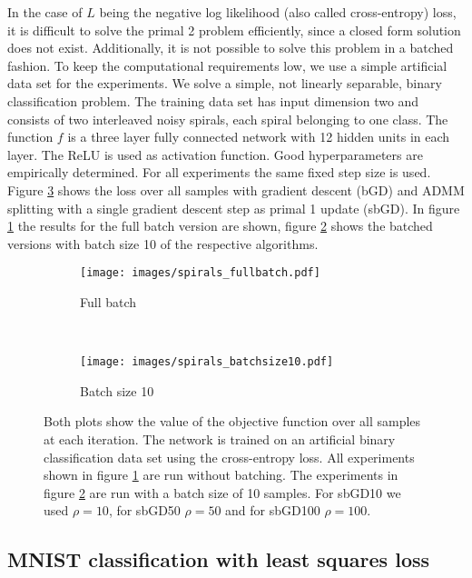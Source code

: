 \documentclass[english,11pt,a4paper]{article}
\begin{document}
In the case of $L$ being the negative log likelihood (also called cross-entropy) loss, it is difficult to solve the primal 2 problem efficiently, since a closed form solution does not exist. Additionally, it is not possible to solve this problem in a batched fashion. To keep the computational requirements low, we use a simple artificial data set for the experiments. We solve a simple, not linearly separable, binary classification problem. The training data set has input dimension two and consists of two interleaved noisy spirals, each spiral belonging to one class. The function $f$ is a three layer fully connected network with 12 hidden units in each layer. The ReLU is used as activation function. Good hyperparameters are empirically determined. For all experiments the same fixed step size is used. Figure \ref{fig:results_spirals} shows the loss over all samples with gradient descent (bGD) and ADMM splitting with a single gradient descent step as primal 1 update (sbGD). In figure \ref{fig:spirals_fullbatch} the results for the full batch version are shown, figure \ref{fig:spirals_batchsize10} shows the batched versions with batch size 10 of the respective algorithms.

\begin{figure}[t]
	\centering
	\begin{subfigure}[b]{0.5\textwidth}
		\texttt{[image: images/spirals\_fullbatch.pdf]}
		\caption{Full batch}
		\label{fig:spirals_fullbatch}
	\end{subfigure}
	~
	\begin{subfigure}[b]{0.5\textwidth}
		\texttt{[image: images/spirals\_batchsize10.pdf]}
		\caption{Batch size 10}
		\label{fig:spirals_batchsize10}
	\end{subfigure}
	
	\caption{Both plots show the value of the objective function over all samples at each iteration. The network is trained on an artificial binary classification data set using the cross-entropy loss. All experiments shown in figure \ref{fig:spirals_fullbatch} are run without batching. The experiments in figure \ref{fig:spirals_batchsize10} are run with a batch size of 10 samples. For sbGD10 we used $\rho=10$, for sbGD50 $\rho=50$ and for sbGD100 $\rho=100$.}
	
	\label{fig:results_spirals}
\end{figure}

\subsection{MNIST classification with least squares loss}
\end{document}
